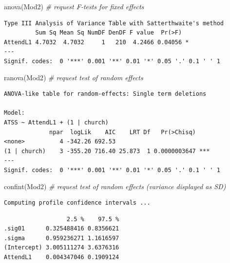 \documentclass[
  11pt,
]{book}
\newenvironment{Shaded}{\begin{snugshade}}{\end{snugshade}}
\newcommand{\CommentTok}[1]{\textcolor[rgb]{0.56,0.35,0.01}{\textit{#1}}}
\newcommand{\FunctionTok}[1]{\textcolor[rgb]{0.00,0.00,0.00}{#1}}
\newcommand{\NormalTok}[1]{#1}
\begin{document}
\begin{Shaded}
\begin{Highlighting}[]
\FunctionTok{anova}\NormalTok{(Mod2) }\CommentTok{\# request F{-}tests for fixed effects}
\end{Highlighting}
\end{Shaded}

\begin{verbatim}
Type III Analysis of Variance Table with Satterthwaite's method
         Sum Sq Mean Sq NumDF DenDF F value  Pr(>F)  
AttendL1 4.7032  4.7032     1   210  4.2466 0.04056 *
---
Signif. codes:  0 '***' 0.001 '**' 0.01 '*' 0.05 '.' 0.1 ' ' 1
\end{verbatim}

\begin{Shaded}
\begin{Highlighting}[]
\FunctionTok{ranova}\NormalTok{(Mod2) }\CommentTok{\# request test of random effects}
\end{Highlighting}
\end{Shaded}

\begin{verbatim}
ANOVA-like table for random-effects: Single term deletions

Model:
ATSS ~ AttendL1 + (1 | church)
             npar  logLik    AIC    LRT Df   Pr(>Chisq)    
<none>          4 -342.26 692.53                           
(1 | church)    3 -355.20 716.40 25.873  1 0.0000003647 ***
---
Signif. codes:  0 '***' 0.001 '**' 0.01 '*' 0.05 '.' 0.1 ' ' 1
\end{verbatim}

\begin{Shaded}
\begin{Highlighting}[]
\FunctionTok{confint}\NormalTok{(Mod2) }\CommentTok{\# request test of random effects (variance displayed as SD)}
\end{Highlighting}
\end{Shaded}

\begin{verbatim}
Computing profile confidence intervals ...
\end{verbatim}

\begin{verbatim}
                  2.5 %    97.5 %
.sig01      0.325488416 0.8356621
.sigma      0.959236271 1.1616597
(Intercept) 3.005111274 3.6376316
AttendL1    0.004347046 0.1909124
\end{verbatim}
\end{document}
